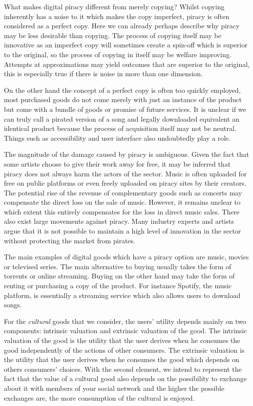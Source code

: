 \documentclass[12pt]{article}
\numberwithin{equation}{section}
\begin{document}
What makes digital piracy different from merely copying? Whilst copying inherently has a noise to it which makes the copy imperfect, piracy is often considered as a perfect copy. Here we can already perhaps describe why piracy may be less desirable than copying. The process of copying itself may be innovative as an imperfect copy will sometimes create a spin-off which is superior to the original, so the process of copying in itself may be welfare improving. Attempts at approximations may yield outcomes that are superior to the original, this is especially true if there is noise in more than one dimension.

On the other hand the concept of a perfect copy is often too quickly employed, most purchased goods do not come merely with just an instance of the product but come with a bundle of goods or promise of future services. It is unclear if we can truly call a pirated version of a song and legally downloaded equivalent an identical product because the process of acquisition itself may not be neutral. Things such as accessibility and user interface also undoubtedly play a role.
\fi

The magnitude of the damage caused by piracy is ambiguous. Given the fact that some artists choose to give their work away for free, it may be inferred that piracy does not always harm the actors of the sector. Music is often uploaded for free on public platforms or even freely uploaded on piracy sites by their creators. The potential rise of the revenue of complementary goods such as concerts may compensate the direct loss on the sale of music. However, it remains unclear to which extent this entirely compensates for the loss in direct music sales. There also exist large movements against piracy. Many industry experts and artists argue that it is not possible to maintain a high level of innovation in the sector without protecting the market from pirates.

The main examples of digital goods which have a piracy option are music, movies or televised series. The main alternative to buying usually takes the form of torrents or online streaming. Buying on the other hand may take the form of renting or purchasing a copy of the product. For instance Spotify, the music platform, is essentially a streaming service which also allows users to download songs.

For the \textit{cultural} goods that we consider, the users' utility depends mainly on two components:  intrinsic valuation and extrinsic valuation of the good. The intrinsic valuation of the good is the utility that the user derives when he consumes the good independently of the actions of other consumers. The extrinsic valuation is the utility that the user derives when he consumes the good which depends on others consumers' choices. With the second element, we intend to represent the fact that the value of a cultural good also depends on the possibility to exchange about it with members of your social network and the higher the possible exchanges are, the more consumption of the cultural is enjoyed. 
\end{document}
